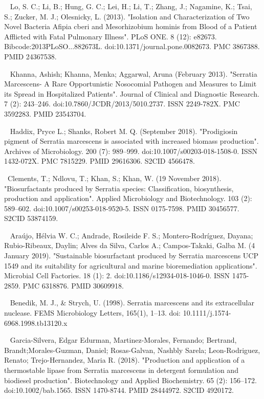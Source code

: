 \documentclass[11pt]{article}
\begin{document}
\begin{thebibliography}{3}
	~ Lo, S. C.; Li, B.; Hung, G. C.; Lei, H.; Li, T.; Zhang, J.; Nagamine, K.; Tsai, S.; Zucker, M. J.; Olesnicky, L. (2013). "Isolation and Characterization of Two Novel Bacteria Afipia cberi and Mesorhizobium hominis from Blood of a Patient Afflicted with Fatal Pulmonary Illness". PLoS ONE. 8 (12): e82673. Bibcode:2013PLoSO...882673L. doi:10.1371/journal.pone.0082673. PMC 3867388. PMID 24367538.
	
	
	~ Khanna, Ashish; Khanna, Menka; Aggarwal, Aruna (February 2013). "Serratia Marcescens- A Rare Opportunistic Nosocomial Pathogen and Measures to Limit its Spread in Hospitalized Patients". Journal of Clinical and Diagnostic Research. 7 (2): 243–246. doi:10.7860/JCDR/2013/5010.2737. ISSN 2249-782X. PMC 3592283. PMID 23543704.
	
	~ Haddix, Pryce L.; Shanks, Robert M. Q. (September 2018). "Prodigiosin pigment of Serratia marcescens is associated with increased biomass production". Archives of Microbiology. 200 (7): 989–999. doi:10.1007/s00203-018-1508-0. ISSN 1432-072X. PMC 7815229. PMID 29616306. S2CID 4566478.
	
	~Clements, T.; Ndlovu, T.; Khan, S.; Khan, W. (19 November 2018). "Biosurfactants produced by Serratia species: Classification, biosynthesis, production and application". Applied Microbiology and Biotechnology. 103 (2): 589–602. doi:10.1007/s00253-018-9520-5. ISSN 0175-7598. PMID 30456577. S2CID 53874159.
	
	~ Araújo, Hélvia W. C.; Andrade, Rosileide F. S.; Montero-Rodríguez, Dayana; Rubio-Ribeaux, Daylin; Alves da Silva, Carlos A.; Campos-Takaki, Galba M. (4 January 2019). "Sustainable biosurfactant produced by Serratia marcescens UCP 1549 and its suitability for agricultural and marine bioremediation applications". Microbial Cell Factories. 18 (1): 2. doi:10.1186/s12934-018-1046-0. ISSN 1475-2859. PMC 6318876. PMID 30609918.
	
	~ Benedik, M. J., \& Strych, U. (1998). Serratia marcescens and its extracellular nuclease. FEMS Microbiology Letters, 165(1), 1–13. doi: 10.1111/j.1574-6968.1998.tb13120.x
	
	~ Garcia-Silvera, Edgar Edurman, 
	Martinez-Morales, Fernando; Bertrand, Brandt;Morales-Guzman, Daniel; Rosas-Galvan, Nashbly Sarela; Leon-Rodriguez, Renato; Trejo-Hernandez, Maria R. (2018). "Production and application of a thermostable lipase from Serratia marcescens in detergent formulation and biodiesel production". Biotechnology and Applied Biochemistry. 65 (2): 156–172. doi:10.1002/bab.1565. ISSN 1470-8744. PMID 28444972. S2CID 4920172.
	

\end{thebibliography}
\end{document}
